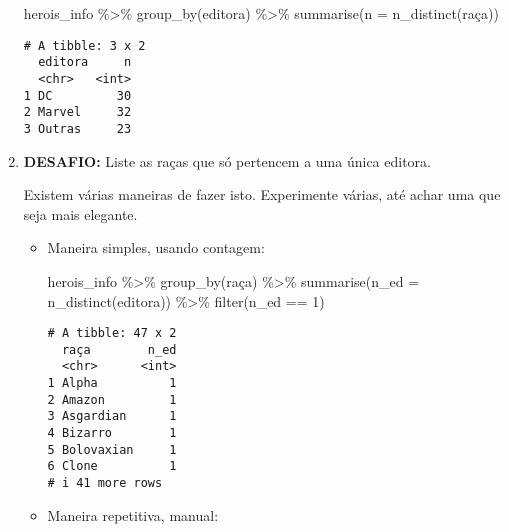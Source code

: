\documentclass[
  letterpaper,
  DIV=11,
  numbers=noendperiod]{scrreprt}
\newenvironment{Shaded}{\begin{snugshade}}{\end{snugshade}}
\newcommand{\AttributeTok}[1]{\textcolor[rgb]{0.40,0.45,0.13}{#1}}
\newcommand{\DecValTok}[1]{\textcolor[rgb]{0.68,0.00,0.00}{#1}}
\newcommand{\FunctionTok}[1]{\textcolor[rgb]{0.28,0.35,0.67}{#1}}
\newcommand{\NormalTok}[1]{\textcolor[rgb]{0.00,0.23,0.31}{#1}}
\newcommand{\SpecialCharTok}[1]{\textcolor[rgb]{0.37,0.37,0.37}{#1}}
\begin{document}
\begin{enumerate}
\begin{tcolorbox}
\begin{Shaded}
\begin{Highlighting}[]
\NormalTok{herois\_info }\SpecialCharTok{\%\textgreater{}\%} 
  \FunctionTok{group\_by}\NormalTok{(editora) }\SpecialCharTok{\%\textgreater{}\%} 
  \FunctionTok{summarise}\NormalTok{(}\AttributeTok{n =} \FunctionTok{n\_distinct}\NormalTok{(raça))}
\end{Highlighting}
\end{Shaded}

\begin{verbatim}
# A tibble: 3 x 2
  editora     n
  <chr>   <int>
1 DC         30
2 Marvel     32
3 Outras     23
\end{verbatim}

  \end{tcolorbox}
\item
  \textbf{DESAFIO:} Liste as raças que só pertencem a uma única editora.

  Existem várias maneiras de fazer isto. Experimente várias, até achar
  uma que seja mais elegante.

  \begin{tcolorbox}[enhanced jigsaw, coltitle=black, colbacktitle=quarto-callout-tip-color!10!white, title=\textcolor{quarto-callout-tip-color}{\faLightbulb}\hspace{0.5em}{Resposta}, toprule=.15mm, leftrule=.75mm, opacityback=0, colback=white, arc=.35mm, breakable, bottomtitle=1mm, left=2mm, toptitle=1mm, titlerule=0mm, rightrule=.15mm, bottomrule=.15mm, opacitybacktitle=0.6, colframe=quarto-callout-tip-color-frame]

  \begin{itemize}
  \item
    Maneira simples, usando contagem:

\begin{Shaded}
\begin{Highlighting}[]
\NormalTok{herois\_info }\SpecialCharTok{\%\textgreater{}\%} 
  \FunctionTok{group\_by}\NormalTok{(raça) }\SpecialCharTok{\%\textgreater{}\%} 
  \FunctionTok{summarise}\NormalTok{(}\AttributeTok{n\_ed =} \FunctionTok{n\_distinct}\NormalTok{(editora)) }\SpecialCharTok{\%\textgreater{}\%} 
  \FunctionTok{filter}\NormalTok{(n\_ed }\SpecialCharTok{==} \DecValTok{1}\NormalTok{)}
\end{Highlighting}
\end{Shaded}

\begin{verbatim}
# A tibble: 47 x 2
  raça        n_ed
  <chr>      <int>
1 Alpha          1
2 Amazon         1
3 Asgardian      1
4 Bizarro        1
5 Bolovaxian     1
6 Clone          1
# i 41 more rows
\end{verbatim}
  \item
    Maneira repetitiva, manual:


\end{itemize}
\end{tcolorbox}
\end{enumerate}
\end{document}

